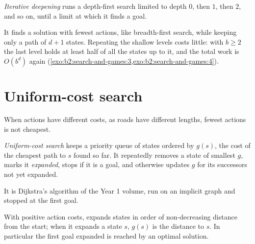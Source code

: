\begin{definition}\label{def:b2:search-and-games:iddfs}
\emph{Iterative deepening} runs a depth-first search limited to depth $0$, then $1$, then $2$,
and so on, until a limit at which it finds a goal.
\end{definition}

It finds a solution with fewest actions, like breadth-first search, while keeping only a path of $d + 1$ states. Repeating
the shallow levels costs little: with $b \geq 2$ the last level holds at least half of all the states up to it, and the
total work is $O(b^d)$ again (\cref{exo:b2:search-and-games:3,exo:b2:search-and-games:4}).

\label{lst:b2:search-and-games:iddfs}

\section{Uniform-cost search}\label{sec:b2:search-and-games:ucs}

When actions have different costs, as roads have different lengths, fewest actions is not cheapest.

\begin{definition}\label{def:b2:search-and-games:ucs}
\emph{Uniform-cost search} keeps a priority queue of states ordered by $g(s)$, the cost of the
cheapest path to $s$ found so far. It repeatedly removes a state of smallest $g$, marks it \emph{expanded}, stops if it is
a goal, and otherwise updates $g$ for its successors not yet expanded.
\end{definition}

It is Dijkstra's algorithm of the Year 1 volume, run on an implicit graph and stopped at the first goal.

\begin{theorem}\label{thm:b2:search-and-games:ucs}
With positive action costs,  expands states in order of non-decreasing distance from the start; when
it expands a state $s$, $g(s)$ is the distance to $s$. In particular the first goal expanded is reached by an optimal
solution.
\end{theorem}

